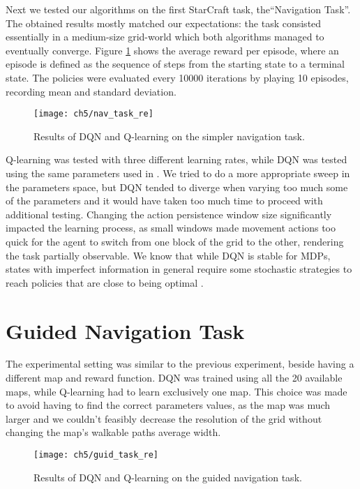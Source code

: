 Next we tested our algorithms on the first StarCraft task, the``Navigation
Task''. The obtained results mostly matched our expectations: the task consisted
essentially in a medium-size grid-world which both algorithms managed to
eventually converge. Figure \ref{fig:nav_task_results} shows the average reward
per episode, where an episode is defined as the sequence of steps from the
starting state to a terminal state. The policies were evaluated every 10000
iterations by playing 10 episodes, recording mean and standard deviation.

\begin{figure}[h]
    \centering
    \texttt{[image: ch5/nav\_task\_re]}
    \caption{Results of DQN and Q-learning on the simpler navigation task.}
    \label{fig:nav_task_results}
\end{figure}

Q-learning was tested with three different learning rates, while DQN was tested
using the same parameters used in \cite{mnih2015human}. We tried to do a more
appropriate sweep in the parameters space, but DQN tended to diverge when
varying too much some of the parameters and it would have taken too much time to
proceed with additional testing. Changing the action persistence window size
significantly impacted the learning process, as small windows made movement
actions too quick for the agent to switch from one block of the grid to the
other, rendering the task partially observable. We know that while DQN is stable
for MDPs, states with imperfect information in general require some stochastic
strategies to reach policies that are close to being optimal
\citep{heinrich2016deep}.

\section{Guided Navigation Task}

The experimental setting was similar to the previous experiment, beside having a
different map and reward function. DQN was trained using all the 20 available
maps, while Q-learning had to learn exclusively one map. This choice was made to
avoid having to find the correct parameters values, as the map was much larger
and we couldn't feasibly decrease the resolution of the grid without changing
the map's walkable paths average width.

\begin{figure}[h]
    \centering
    \texttt{[image: ch5/guid\_task\_re]}
    \caption{Results of DQN and Q-learning on the guided navigation task.}
    \label{fig:guid_task_results}
\end{figure}

